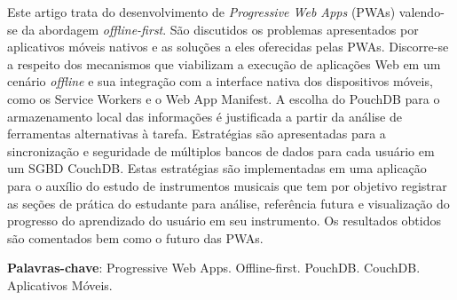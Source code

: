 \documentclass[
	article,			%
	11pt,				%
	oneside,			%
	a4paper,			%
	english,			%
	brazil,				%
	sumario=tradicional
	]{abntex2}
\begin{document}

\frenchspacing 


%
%
\maketitle

\begin{resumoumacoluna}
Este artigo trata do desenvolvimento de \textit{Progressive Web Apps} (PWAs) valendo-se da abordagem \textit{offline-first}. São discutidos os problemas apresentados por aplicativos móveis nativos e as soluções a eles oferecidas pelas PWAs. Discorre-se a respeito dos mecanismos que viabilizam a execução de aplicações Web em um cenário \textit{offline} e sua integração com a interface nativa dos dispositivos móveis, como os Service Workers e o Web App Manifest. A escolha do PouchDB para o armazenamento local das informações é justificada a partir da análise de ferramentas alternativas à tarefa. Estratégias são apresentadas para a sincronização e seguridade de múltiplos bancos de dados para cada usuário em um SGBD CouchDB. Estas estratégias são implementadas em uma aplicação para o auxílio do estudo de instrumentos musicais que tem por objetivo registrar as seções de prática do estudante para análise, referência futura e visualização do progresso do aprendizado do usuário em seu instrumento. Os resultados obtidos são comentados bem como o futuro das PWAs.
\vspace{\onelineskip}

\noindent
\textbf{Palavras-chave}: Progressive Web Apps. Offline-first. PouchDB. CouchDB. Aplicativos Móveis.
\end{resumoumacoluna}


\textual
\end{document}
